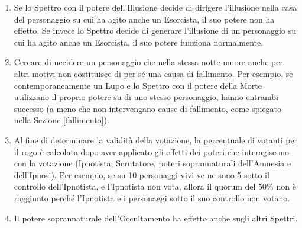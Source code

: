 \documentclass[a4paper,10pt]{article}
\begin{document}
\begin{enumerate}
 \item Se lo Spettro con il potere dell'Illusione decide di dirigere l'illusione nella casa del personaggio su cui ha agito anche un Esorcista, il suo potere non ha effetto.
 Se invece lo Spettro decide di generare l'illusione di un personaggio su cui ha agito anche un Esorcista, il suo potere funziona normalmente.
 
 \item Cercare di uccidere un personaggio che nella stessa notte muore anche per altri motivi non costituisce di per sé una causa di fallimento.
 Per esempio, se contemporaneamente un Lupo e lo Spettro con il potere della Morte utilizzano il proprio potere su di uno stesso personaggio, hanno entrambi successo (a meno che non intervengano cause di fallimento, come spiegato nella Sezione \ref{fallimento}).
 
 
 
 \item Al fine di determinare la validità della votazione, la percentuale di votanti per il rogo è calcolata dopo aver applicato gli effetti dei poteri che interagiscono con la votazione (Ipnotista, Scrutatore, poteri soprannaturali dell'Amnesia e dell'Ipnosi).
 Per esempio, se su 10 personaggi vivi ve ne sono 5 sotto il controllo dell'Ipnotista, e l'Ipnotista non vota, allora il quorum del 50\% non è raggiunto perché l'Ipnotista e i personaggi sotto il suo controllo non votano.

 \item Il potere soprannaturale dell'Occultamento ha effetto anche sugli altri Spettri.
 

\end{enumerate}
\end{document}
